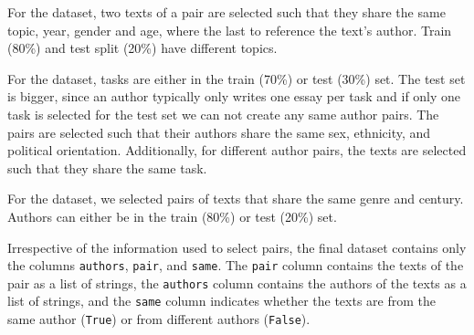 \begin{sidewaystable}
\centering\small
\caption{Statistics of preprocessed datasets \dataPan{}, \dataBlog{}, \dataGutenberg{}, and \dataStudent{}.}
\label{tab:data_stats}
\end{sidewaystable}

For the \dataBlog{} dataset, 
two texts of a pair are selected such that they share the same topic, year, gender and age, where the last to reference the text's author.
Train (80\%) and test split (20\%) have different topics.

For the \dataStudent{} dataset,
tasks are either in the train (70\%) or test (30\%) set.
The test set is bigger, since an author typically only writes one essay per task and if only one task is selected for the test set we can not create any same author pairs.
The pairs are selected such that their authors share the same sex, ethnicity, and political orientation.
Additionally, for different author pairs, the texts are selected such that they share the same task.

For the \dataGutenberg{} dataset,
we selected pairs of texts that share the same genre and century.
Authors can either be in the train (80\%) or test (20\%) set.

Irrespective of the information used to select pairs, the final dataset contains only the columns \texttt{authors}, \texttt{pair}, and \texttt{same}.
The \texttt{pair} column contains the texts of the pair as a list of strings,
the \texttt{authors} column contains the authors of the texts as a list of strings,
and the \texttt{same} column indicates whether the texts are from the same author (\texttt{True}) or from different authors (\texttt{False}).
